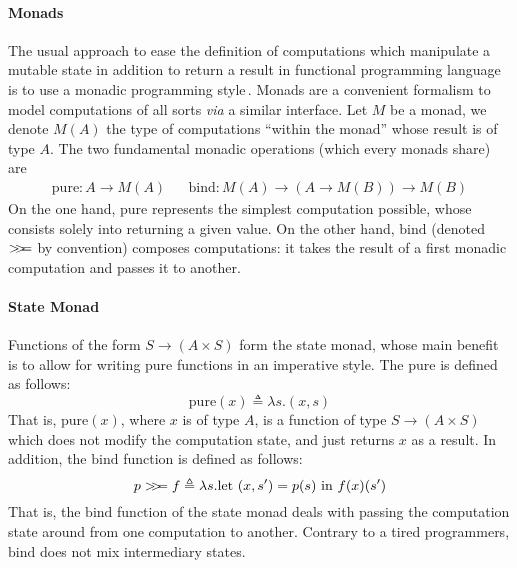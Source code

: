 \paragraph{Monads}
%
The usual approach to ease the definition of computations which manipulate a
mutable state in addition to return a result in functional programming language
is to use a monadic programming
style\,\cite{wadler1990comprehending,jones2005io}.
%
Monads are a convenient formalism to model computations of all sorts \emph{via}
a similar interface.
%
Let $M$ be a monad, we denote $M(A)$ the type of computations ``within the
monad'' whose result is of type $A$.
%
The two fundamental monadic operations (which every monads share) are
%
\begin{align*}
  \mathrm{pure} : A \rightarrow M(A)
  &
  & \mathrm{bind} : M(A) \rightarrow (A \rightarrow M(B)) \rightarrow M(B)
\end{align*}
%
On the one hand, $\mathrm{pure}$ represents the simplest computation possible,
whose consists solely into returning a given value.
%
On the other hand, $\mathrm{bind}$ (denoted $>\!\!>\!\!=$ by convention) composes
computations: it takes the result of a first monadic computation and passes it
to another.

\paragraph{State Monad}
%
Functions of the form $S \rightarrow (A \times S)$ form the state monad, whose
main benefit is to allow for writing pure functions in an imperative style.
%
The $\mathrm{pure}$ is defined as follows:
%
\[
  \mathrm{pure}(x) \triangleq \lambda s. (x, s)
\]
%
That is, $\mathrm{pure}(x)$, where $x$ is of type $A$, is a function of type
$S \rightarrow (A \times S)$ which does not modify the computation state, and
just returns $x$ as a result.
%
In addition, the $\mathrm{bind}$ function is defined as follows:
\[
  p >\!\!>\!\!= f \triangleq \lambda s. \mathrm{let\ } (x, s') = p(s) \mathrm{\ in\ }
  f(x)(s')
\]
%
That is, the $\mathrm{bind}$ function of the state monad deals with passing the
computation state around from one computation to another.
%
Contrary to a tired programmers, $\mathrm{bind}$ does not mix intermediary
states.

